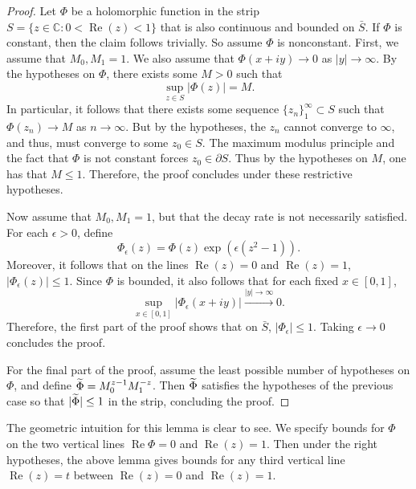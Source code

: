 \documentclass{article}
\begin{document}
\begin{proof}
	Let $\Phi$ be a holomorphic function in the strip $S = \{z \in \mathbb{C}: 0 < \operatorname{Re}(z) < 1\}$ that is also continuous and bounded on $\bar{S}$. If $\Phi$ is constant, then the claim follows trivially. So assume $\Phi$ is nonconstant. First, we assume that $M_{0}, M_{1} = 1$. We also assume that $\Phi(x + iy) \to 0$ as $|y| \to \infty$. By the hypotheses on $\Phi$, there exists some $M > 0$ such that 
	\begin{equation*}
		\sup_{z \in S}|\Phi(z)| = M. 
	\end{equation*}
	In particular, it follows that there exists some sequence $\{z_{n}\}_{1}^{\infty}\subset S$ such that $\Phi(z_{n}) \to M$ as $n \to\infty$. But by the hypotheses, the $z_{n}$ cannot converge to $\infty$, and thus, must converge to some $z_{0} \in S$. The maximum modulus principle and the fact that $\Phi$ is not constant forces $z_{0} \in \partial S$. Thus by the hypotheses on $M$, one has that $M \leq 1$. Therefore, the proof concludes under these restrictive hypotheses. 
	
	Now assume that $M_{0}, M_{1} = 1$, but that the decay rate is not necessarily satisfied. For each $\epsilon > 0$, define 
	\begin{equation*}
		\Phi_{\epsilon}(z) = \Phi(z) \exp\left(\epsilon(z^{2} - 1)\right). 
	\end{equation*}
	Moreover, it follows that on the lines $\operatorname{Re}(z) = 0$ and $\operatorname{Re}(z) = 1$, $|\Phi_{\epsilon}(z)| \leq 1$. Since $\Phi$ is bounded, it also follows that for each fixed $x \in [0,1]$, 
	\begin{equation*}
		\sup_{x \in [0,1]}|\Phi_{\epsilon}(x + iy)| \xrightarrow{|y| \to \infty} 0. 
	\end{equation*}
	Therefore, the first part of the proof shows that on $\bar{S}$, $|\Phi_{\epsilon}| \leq 1$. Taking $\epsilon \to 0$ concludes the proof. 
	
	For the final part of the proof, assume the least possible number of hypotheses on $\Phi$, and define $\widetilde{\Phi} = M_{0}^{z - 1}M_{1}^{-z}$. Then $\widetilde{\Phi}$ satisfies the hypotheses of the previous case so that $|\widetilde{\Phi}| \leq 1$ in the strip, concluding the proof. 
\end{proof} 
\begin{remark}
	The geometric intuition for this lemma is clear to see. We specify bounds for $\Phi$ on the two vertical lines $\operatorname{Re}{\Phi} = 0$ and $\operatorname{Re}(z) = 1$. Then under the right hypotheses, the above lemma gives bounds for any third vertical line $\operatorname{Re}(z)= t$ between $\operatorname{Re}(z) = 0$ and $\operatorname{Re}(z) = 1$. 
\end{remark} 
\end{document}
